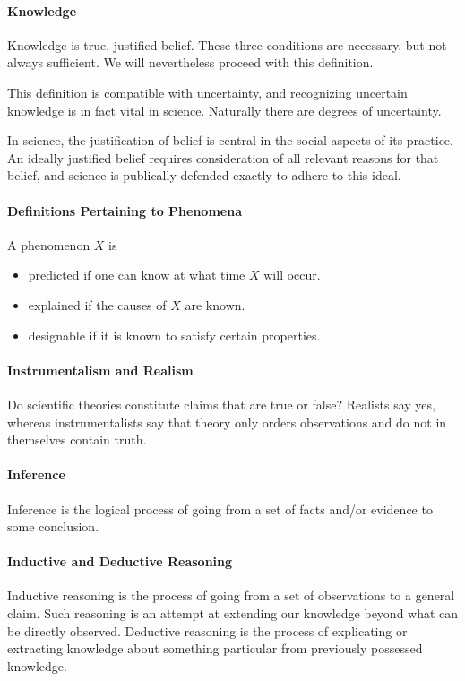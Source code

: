 \paragraph{Knowledge}
Knowledge is true, justified belief. These three conditions are necessary, but not always sufficient. We will nevertheless proceed with this definition.

This definition is compatible with uncertainty, and recognizing uncertain knowledge is in fact vital in science. Naturally there are degrees of uncertainty.

In science, the justification of belief is central in the social aspects of its practice. An ideally justified belief requires consideration of all relevant reasons for that belief, and science is publically defended exactly to adhere to this ideal.

\paragraph{Definitions Pertaining to Phenomena}
A phenomenon $X$ is
\begin{itemize}
	\item predicted if one can know at what time $X$ will occur.
	\item explained if the causes of $X$ are known.
	\item designable if it is known to satisfy certain properties.
\end{itemize}

\paragraph{Instrumentalism and Realism}
Do scientific theories constitute claims that are true or false? Realists say yes, whereas instrumentalists say that theory only orders observations and do not in themselves contain truth.

\paragraph{Inference}
Inference is the logical process of going from a set of facts and/or evidence to some conclusion.

\paragraph{Inductive and Deductive Reasoning}
Inductive reasoning is the process of going from a set of observations to a general claim. Such reasoning is an attempt at extending our knowledge beyond what can be directly observed. Deductive reasoning is the process of explicating or extracting knowledge about something particular from previously possessed knowledge.

